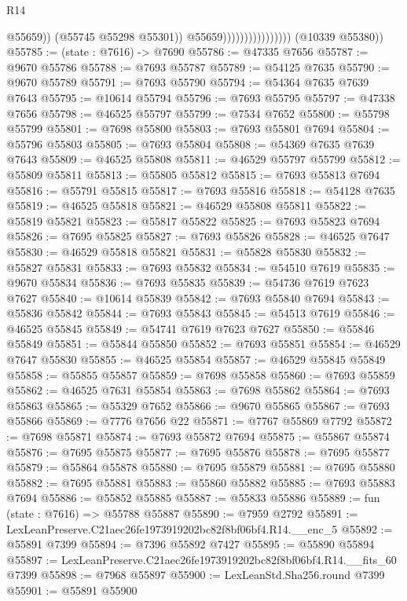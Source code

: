 \begin{lexlean}{R14}
\begin{coremodule}
                                            @55659))
                                        (@55745 @55298 @55301))
                                      @55659))))))))))))))))
      (@10339 @55380))
@55785 := (state : @7616) -> @7690
@55786 := @47335 @7656
@55787 := @9670 @55786
@55788 := @7693 @55787
@55789 := @54125 @7635
@55790 := @9670 @55789
@55791 := @7693 @55790
@55794 := @54364 @7635 @7639 @7643
@55795 := @10614 @55794
@55796 := @7693 @55795
@55797 := @47338 @7656
@55798 := @46525 @55797
@55799 := @7534 @7652
@55800 := @55798 @55799
@55801 := @7698 @55800
@55803 := @7693 @55801 @7694
@55804 := @55796 @55803
@55805 := @7693 @55804
@55808 := @54369 @7635 @7639 @7643
@55809 := @46525 @55808
@55811 := @46529 @55797 @55799
@55812 := @55809 @55811
@55813 := @55805 @55812
@55815 := @7693 @55813 @7694
@55816 := @55791 @55815
@55817 := @7693 @55816
@55818 := @54128 @7635
@55819 := @46525 @55818
@55821 := @46529 @55808 @55811
@55822 := @55819 @55821
@55823 := @55817 @55822
@55825 := @7693 @55823 @7694
@55826 := @7695 @55825
@55827 := @7693 @55826
@55828 := @46525 @7647
@55830 := @46529 @55818 @55821
@55831 := @55828 @55830
@55832 := @55827 @55831
@55833 := @7693 @55832
@55834 := @54510 @7619
@55835 := @9670 @55834
@55836 := @7693 @55835
@55839 := @54736 @7619 @7623 @7627
@55840 := @10614 @55839
@55842 := @7693 @55840 @7694
@55843 := @55836 @55842
@55844 := @7693 @55843
@55845 := @54513 @7619
@55846 := @46525 @55845
@55849 := @54741 @7619 @7623 @7627
@55850 := @55846 @55849
@55851 := @55844 @55850
@55852 := @7693 @55851
@55854 := @46529 @7647 @55830
@55855 := @46525 @55854
@55857 := @46529 @55845 @55849
@55858 := @55855 @55857
@55859 := @7698 @55858
@55860 := @7693 @55859
@55862 := @46525 @7631 @55854
@55863 := @7698 @55862
@55864 := @7693 @55863
@55865 := @55329 @7652
@55866 := @9670 @55865
@55867 := @7693 @55866
@55869 := @7776 @7656 @22
@55871 := @7767 @55869 @7792
@55872 := @7698 @55871
@55874 := @7693 @55872 @7694
@55875 := @55867 @55874
@55876 := @7695 @55875
@55877 := @7695 @55876
@55878 := @7695 @55877
@55879 := @55864 @55878
@55880 := @7695 @55879
@55881 := @7695 @55880
@55882 := @7695 @55881
@55883 := @55860 @55882
@55885 := @7693 @55883 @7694
@55886 := @55852 @55885
@55887 := @55833 @55886
@55889 := fun (state : @7616) => @55788 @55887
@55890 := @7959 @2792
@55891 := LexLeanPreserve.C21aec26fe1973919202bc82f8bf06bf4.R14.__enc_5
@55892 := @55891 @7399
@55894 := @7396 @55892 @7427
@55895 := @55890 @55894
@55897 := LexLeanPreserve.C21aec26fe1973919202bc82f8bf06bf4.R14.__fits_60 @7399
@55898 := @7968 @55897
@55900 := LexLeanStd.Sha256.round @7399
@55901 := @55891 @55900

\end{coremodule}
\end{lexlean}
